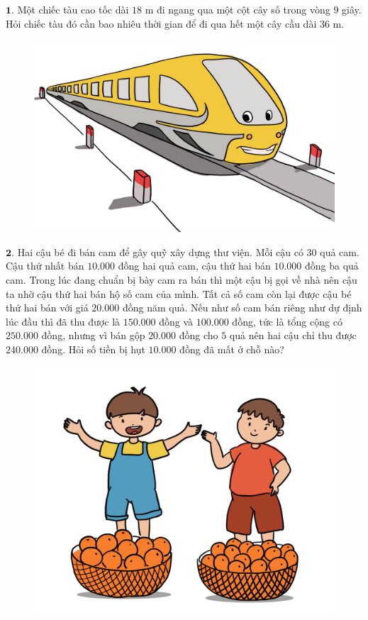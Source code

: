 \begin{multicols}{2}
	$\pmb{1.}$ Một chiếc tàu cao tốc dài $18$ m đi ngang qua một cột cây số trong vòng $9$ giây. Hỏi chiếc tàu đó cần bao nhiêu thời gian để đi qua hết một cây cầu dài $36$ m. 
	\begin{figure}[H]
		\centering
		\vspace*{-10pt}
		\captionsetup{labelformat= empty, justification=centering}
		\includegraphics[width=1\linewidth]{Pi10_ToanBi_Bai1}
		\vspace*{-15pt}
	\end{figure}
	\vskip 0.1cm
	$\pmb{2.}$ Hai cậu bé đi bán cam để gây quỹ xây dựng thư viện. Mỗi cậu có $30$ quả cam. Cậu thứ nhất bán  $10{.}000$ đồng hai quả cam, cậu thứ hai bán $10{.}000$ đồng ba quả cam. Trong lúc đang chuẩn bị bày cam ra bán thì một cậu bị gọi về nhà nên cậu ta nhờ cậu thứ hai bán hộ số cam của mình. Tất cả số cam còn lại được cậu bé thứ hai bán với giá $20{.}000$ đồng năm quả. Nếu như số cam bán riêng như dự định lúc đầu thì đã thu được là $150{.}000$ đồng và $100{.}000$ đồng, tức là tổng cộng có $250{.}000$ đồng, nhưng vì bán gộp $20{.}000$ đồng cho $5$ quả nên  hai cậu chỉ thu được $240{.}000$ đồng. Hỏi số tiền bị hụt $10{.}000$ đồng đã mất ở chỗ nào?
	\begin{figure}[H]
		\centering
		\vspace*{-10pt}
		\captionsetup{labelformat= empty, justification=centering}
		\includegraphics[width=0.8\linewidth]{Pi10_ToanBi_Bai2}

\end{figure}
\end{multicols}
